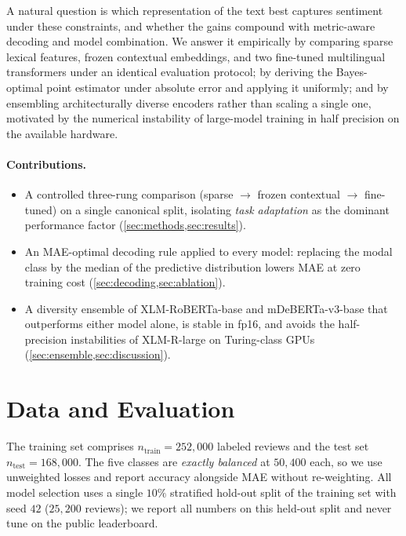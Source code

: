 \documentclass{article}
\theoremstyle{plain}
\theoremstyle{definition}
\theoremstyle{remark}
\begin{document}
A natural question is which representation of the text best captures
sentiment under these constraints, and whether the gains compound with
metric-aware decoding and model combination. We answer it empirically by
comparing sparse lexical features, frozen contextual embeddings, and
two fine-tuned multilingual transformers under an identical evaluation
protocol; by deriving the Bayes-optimal point estimator under absolute
error and applying it uniformly; and by ensembling architecturally
diverse encoders rather than scaling a single one, motivated by the
numerical instability of large-model training in half precision on the
available hardware.

\paragraph{Contributions.}
\begin{itemize}
    \item A controlled three-rung comparison (sparse $\to$ frozen
    contextual $\to$ fine-tuned) on a single canonical split, isolating
    \emph{task adaptation} as the dominant performance factor
    (\cref{sec:methods,sec:results}).
    \item An MAE-optimal decoding rule applied to every model:
    replacing the modal class by the median of the predictive
    distribution lowers MAE at zero training cost
    (\cref{sec:decoding,sec:ablation}).
    \item A diversity ensemble of XLM-RoBERTa-base
    \citep{conneau2020xlmr} and mDeBERTa-v3-base
    \citep{he2023debertav3} that outperforms either model alone, is
    stable in fp16, and avoids the half-precision instabilities of
    XLM-R-large on Turing-class GPUs (\cref{sec:ensemble,sec:discussion}).
\end{itemize}

\section{Data and Evaluation}
\label{sec:data}
The training set comprises $n_{\text{train}}=252{,}000$ labeled reviews
and the test set $n_{\text{test}}=168{,}000$. The five classes are
\emph{exactly balanced} at $50{,}400$ each, so we use unweighted losses
and report accuracy alongside MAE without re-weighting. All model
selection uses a single $10\%$ stratified hold-out split of the training
set with seed $42$ ($25{,}200$ reviews); we report all numbers on this
held-out split and never tune on the public leaderboard.
\end{document}
